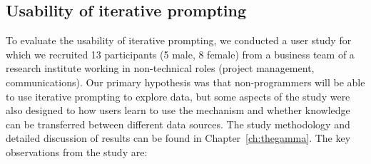 \documentclass[fleqn,11pt]{report}
\theoremstyle{definition}
\begin{document}
\subsection{Usability of iterative prompting}

To evaluate the usability of iterative prompting, we conducted a user study for which we
recruited 13 participants (5 male, 8 female) from a business team of a research institute
working in non-technical roles (project management, communications).
Our primary hypothesis was that non-programmers will be able to use iterative prompting
to explore data, but some aspects of the study were also designed to how users learn to use
the mechanism and whether knowledge can be transferred between different data sources.
The study methodology and detailed discussion of results can be found in Chapter~\ref{ch:thegamma}.
The key observations from the study are:
\end{document}
